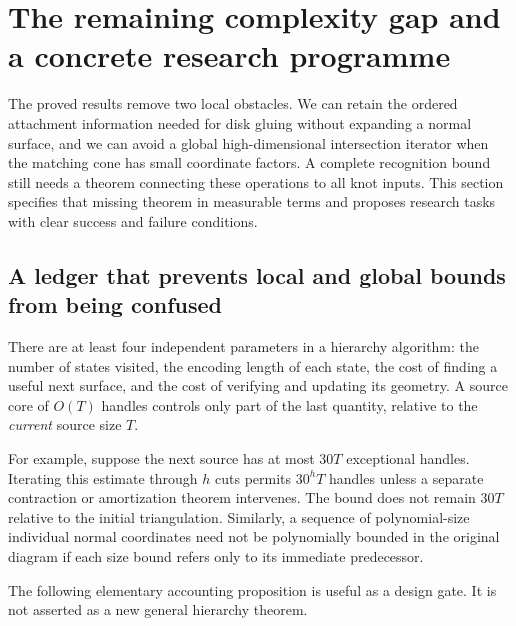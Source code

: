 \section{The remaining complexity gap and a concrete research programme}
\label{main:research}

The proved results remove two local obstacles.  We can retain the ordered
attachment information needed for disk gluing without expanding a normal
surface, and we can avoid a global high-dimensional intersection iterator
when the matching cone has small coordinate factors.  A complete recognition
bound still needs a theorem connecting these operations to all knot inputs.
This section specifies that missing theorem in measurable terms and proposes
research tasks with clear success and failure conditions.

\subsection{A ledger that prevents local and global bounds from being confused}

There are at least four independent parameters in a hierarchy algorithm:
the number of states visited, the encoding length of each state, the cost of
finding a useful next surface, and the cost of verifying and updating its
geometry.  A source core of $O(T)$ handles controls only part of the last
quantity, relative to the \emph{current} source size $T$.

For example, suppose the next source has at most $30T$ exceptional handles.
Iterating this estimate through $h$ cuts permits $30^hT$ handles unless a
separate contraction or amortization theorem intervenes.  The bound does not
remain $30T$ relative to the initial triangulation.  Similarly, a sequence
of polynomial-size individual normal coordinates need not be polynomially
bounded in the original diagram if each size bound refers only to its immediate
predecessor.

The following elementary accounting proposition is useful as a design gate.
It is not asserted as a new general hierarchy theorem.

